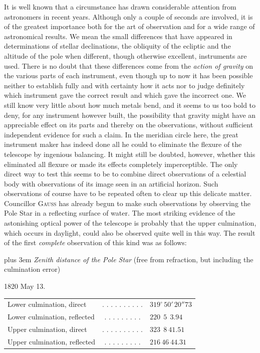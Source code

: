 It is well known that a circumstance has drawn considerable attention from astronomers in recent years. Although only a couple of seconds are involved, it is of the greatest importance both for the art of observation and for a wide range of astronomical results. We mean the small differences that have appeared in determinations of stellar declinations, the obliquity of the ecliptic and the altitude of the pole when different, though otherwise excellent, instruments are used. There is no doubt that these differences come from the \emph{action of gravity} on the various parts of each instrument, even though up to 
now it has been possible neither to establish fully and with certainty how it acts nor to judge definitely which instrument gave the correct result and which gave the incorrect one. We still know very little about how much metals bend, and it seems to us too bold to deny, for any instrument however built, the possibility that gravity might have an appreciable effect on its parts and thereby on the observations, without sufficient independent evidence for such a claim. In the meridian circle here, the great instrument maker has indeed done all he could to eliminate the flexure of the telescope by ingenious balancing. It might still be doubted, however, whether this eliminated all flexure or made its effects completely imperceptible. The only direct way to test this seems to be to combine direct observations of a celestial body with observations of its image seen in an artificial horizon. Such observations of course have to be repeated often to clear up this delicate matter. Councillor \textsc{Gauss} has already begun to make such observations by observing the Pole Star in a reflecting surface of water. The most striking evidence of the astonishing optical power of the telescope is probably that the upper culmination, which occurs in daylight, could also be observed quite well in this way. The result of the first \textit{complete} observation of this kind was as follows:

{\rightskip=0pt plus 3em \textit{Zenith distance of the Pole Star} (free from refraction, but including the culmination error)\par}

\begin{center}
1820 May 13.
\end{center}

\begin{center}
\begin{tabular}{l c l}
Lower culmination, direct & . . . . . . . . . . & $319^\circ\,50'\,20''\!73$ \\
Lower culmination, reflected & . . . . . . . . . & $220\ \ 5\ \ 3.94$ \\
Upper culmination, direct & . . . . . . . . . . & $323\ \ 8\ 41.51$ \\
Upper culmination, reflected & . . . . . . . . . & $216\ 46\ 44.31$ \\
\end{tabular}
\end{center}

